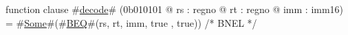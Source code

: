 function clause #\hyperref[zdecode]{decode}# (0b010101 @ rs : regno @ rt : regno @ imm : imm16) =
  #\hyperref[zSome]{Some}#(#\hyperref[zBEQ]{BEQ}#(rs, rt, imm, true , true))   /* BNEL */
